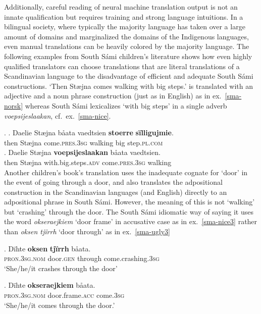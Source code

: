 \documentclass[free]{flammie}
\begin{document}
Additionally, careful reading of neural machine translation output is not an
innate qualification but requires training and strong language intuitions. In a
bilingual society, where typically the majority language has taken over a large
amount of domains and marginalized the domains of the Indigenous languages, even
manual translations can be heavily colored by the majority language.  The
following examples from South Sámi children's literature shows how even highly
qualified translators can choose translations that are literal translations of a
Scandinavian language to the disadvantage of efficient and adequate South Sámi
constructions. `Then Stæjna comes walking with big steps.' is translated with an
adjective and a noun phrase construction (just as in English) as in
ex.~\ref{sma-norsk} whereas South Sámi lexicalizes `with big steps' in a single
adverb \textit{voepsijeslaakan}, cf.\  ex.~\ref{sma-nice}.


\ex.
\ag. Daelie Stæjna båata vaedtsien \textbf{stoerre} \textbf{sïlligujmie}.\label{sma-norsk}\\
then Stæjna come\textsc{.pres.3sg} walking big step\textsc{.pl.com}\\
\bg. Daelie Stæjna \textbf{voepsijeslaakan} båata vaedtsien.\label{sma-nice}\\
then Stæjna with.big.steps\textsc{.adv} come\textsc{.pres.3sg} walking\\



Another children's book's translation uses the inadequate cognate for `door' in
the event of going through a door, and also translates the adpositional
construction in the Scandinavian languages (and English) directly to an
adpositional phrase in South Sámi. However, the meaning of this is not `walking'
but `crashing' through the door.  The South Sámi idiomatic way of saying it uses
the word \textit{okseraejkiem} `door frame' in accusative case as in
ex.~\ref{sma-nice3} rather than \textit{oksen tjïrrh} `door through' as in
ex.~\ref{sma-ugly3}


\exg. Dïhte \textbf{oksen} \textbf{tjïrrh} båata.\label{sma-ugly3}\\
     \textsc{pron.3sg.nom} door\textsc{.gen} through come.crashing\textsc{.3sg}\\
    `She/he/it crashes through the door'

\exg. Dïhte \textbf{okseraejkiem} båata.\label{sma-nice3}\\
    \textsc{pron.3sg.nom} door.frame\textsc{.acc} come\textsc{.3sg}\\
    `She/he/it comes through the door.'
\end{document}
